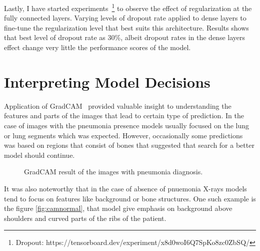 Lastly, I have started experiments~\footnote{Dropout: https://tensorboard.dev/experiment/x8d0woI6Q7SpKo8zc0ZbSQ/} to observe the effect of regularization at the fully connected layers.
Varying levels of dropout rate applied to dense layers to fine-tune the regularization level that best suits this architecture. Results shows that best level of dropout rate as 30\%, albeit dropout rates in the dense layers effect change very little the performance scores of the model.

\section{Interpreting Model Decisions}
Application of GradCAM~\cite{cam} provided valuable insight to understanding the features and parts of the images that lead to certain type of prediction.
In the case of images with the pneumonia presence models usually focused on the lung or lung segments which was expected.
However, occasionally some predictions was based on regions that consist of bones that suggested that search for a better model should continue.

\begin{figure}[H]%
    \centering
    \qquad
    \caption{GradCAM result of the images with pneumonia diagnosis.}%
    \label{fig:campnue}%
\end{figure}

It was also noteworthy that in the case of absence of pnuemonia X-rays models tend to focus on features like background or bone structures.
One such example is the figure \ref{fig:camnormal}, that model give emphasis on background above shoulders and curved parts of the ribs of the patient.

